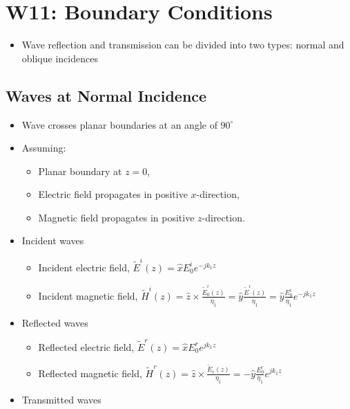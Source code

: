\documentclass[a4paper]{article}
\begin{document}
\newpage
\section{W11: Boundary Conditions}
\begin{itemize}
    \item Wave reflection and transmission can be divided into two types: normal and oblique incidences
\end{itemize}

\subsection{Waves at Normal Incidence}
\begin{itemize}
    \item Wave crosses planar boundaries at an angle of $90^\circ$
    \item Assuming:
    \begin{itemize}[label=$\circ$]
        \item Planar boundary at $z=0$,
        \item Electric field propagates in positive $x$-direction,
        \item Magnetic field propagates in positive $z$-direction.
    \end{itemize}
    \item Incident waves
    \begin{itemize}[label=$\circ$]
        \item Incident electric field, $\widetilde{E}^i(z) = \hat{x}E_{0}^ie^{-jk_1z}$
        \item Incident magnetic field, $\widetilde{H}^i(z) = \hat{z}\times\displaystyle\frac{\widetilde{E}^i_0(z)}{\eta_1} = \hat{y}\displaystyle\frac{\widetilde{E}^i(z)}{\eta_1} = \hat{y}\displaystyle\frac{E^i_0}{\eta_1}e^{-jk_1z}$
    \end{itemize}
    \item Reflected waves
    \begin{itemize}[label=$\circ$]
        \item Reflected electric field, $\widetilde{E}^r(z) = \hat{x}E^r_0e^{jk_1z}$
        \item Reflected magnetic field, $\widetilde{H}^r(z) = \hat{z}\times\displaystyle\frac{\widetilde{E}_r(z)}{\eta_1} = -\hat{y}\displaystyle\frac{E^r_0}{\eta_1}e^{jk_1z}$
    \end{itemize}
    \item Transmitted waves
    \begin{itemize}[label=$\circ$]

\end{itemize}
\end{itemize}
\end{document}
